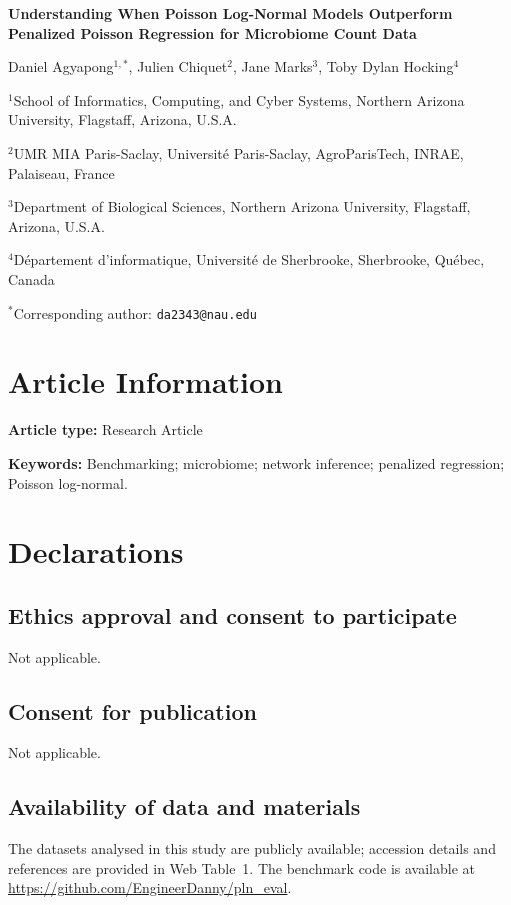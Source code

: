\documentclass[11pt]{article}
\newcommand{\papertitle}{Understanding When Poisson Log-Normal Models Outperform Penalized Poisson Regression for Microbiome Count Data}
\begin{document}
\begin{center}
{\LARGE\bfseries \papertitle\par}
\vspace{1em}
{\large Daniel Agyapong$^{1,*}$, Julien Chiquet$^{2}$, Jane Marks$^{3}$, Toby Dylan Hocking$^{4}$\par}
\vspace{0.75em}
{\small $^{1}$School of Informatics, Computing, and Cyber Systems, Northern Arizona University, Flagstaff, Arizona, U.S.A.\par}
{\small $^{2}$UMR MIA Paris-Saclay, Universit\'{e} Paris-Saclay, AgroParisTech, INRAE, Palaiseau, France\par}
{\small $^{3}$Department of Biological Sciences, Northern Arizona University, Flagstaff, Arizona, U.S.A.\par}
{\small $^{4}$D\'{e}partement d'informatique, Universit\'{e} de Sherbrooke, Sherbrooke, Qu\'{e}bec, Canada\par}
\vspace{0.75em}
{\small $^*$Corresponding author: \texttt{da2343@nau.edu}\par}
\end{center}

\section*{Article Information}

\noindent\textbf{Article type:} Research Article

\noindent\textbf{Keywords:} Benchmarking; microbiome; network inference; penalized regression; Poisson log-normal.

\section*{Declarations}

\subsection*{Ethics approval and consent to participate}
Not applicable.

\subsection*{Consent for publication}
Not applicable.

\subsection*{Availability of data and materials}
The datasets analysed in this study are publicly available; accession details and references are provided in Web Table~1.
The benchmark code is available at \url{https://github.com/EngineerDanny/pln_eval}.
\end{document}
